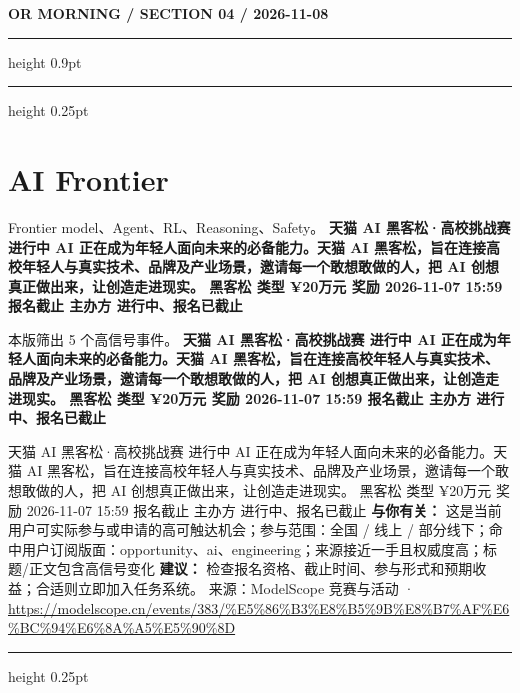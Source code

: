 \documentclass[10.5pt]{ctexart}
\begin{document}
\newpage
{\small\bfseries OR MORNING / SECTION 04 / 2026-11-08}
\vspace{2mm}
\hrule height 0.9pt
\vspace{1.5mm}
\hrule height 0.25pt
\vspace{4mm}
\section*{AI Frontier}
{\color{ormuted} Frontier model、Agent、RL、Reasoning、Safety。}
\vspace{2mm}
{\LARGE\bfseries 天猫 AI 黑客松·高校挑战赛 进行中 AI 正在成为年轻人面向未来的必备能力。天猫 AI 黑客松，旨在连接高校年轻人与真实技术、品牌及产业场景，邀请每一个敢想敢做的人，把 AI 创想真正做出来，让创造走进现实。 黑客松 类型 ¥20万元 奖励 2026-11-07 15:59 报名截止 主办方 进行中、报名已截止}\par
\vspace{1mm}
{\color{ormuted} 本版筛出 5 个高信号事件。}
\vspace{3mm}
{\Large\bfseries 天猫 AI 黑客松·高校挑战赛 进行中 AI 正在成为年轻人面向未来的必备能力。天猫 AI 黑客松，旨在连接高校年轻人与真实技术、品牌及产业场景，邀请每一个敢想敢做的人，把 AI 创想真正做出来，让创造走进现实。 黑客松 类型 ¥20万元 奖励 2026-11-07 15:59 报名截止 主办方 进行中、报名已截止}\par
天猫 AI 黑客松·高校挑战赛 进行中 AI 正在成为年轻人面向未来的必备能力。天猫 AI 黑客松，旨在连接高校年轻人与真实技术、品牌及产业场景，邀请每一个敢想敢做的人，把 AI 创想真正做出来，让创造走进现实。 黑客松 类型 ¥20万元 奖励 2026-11-07 15:59 报名截止 主办方 进行中、报名已截止
\textbf{与你有关：} 这是当前用户可实际参与或申请的高可触达机会；参与范围：全国 / 线上 / 部分线下；命中用户订阅版面：opportunity、ai、engineering；来源接近一手且权威度高；标题/正文包含高信号变化
\textbf{建议：} 检查报名资格、截止时间、参与形式和预期收益；合适则立即加入任务系统。
{\footnotesize\color{ormuted} 来源：ModelScope 竞赛与活动 · \url{https://modelscope.cn/events/383/%E5%86%B3%E8%B5%9B%E8%B7%AF%E6%BC%94%E6%8A%A5%E5%90%8D}}
\vspace{4mm}
\hrule height 0.25pt
\vspace{3mm}
\end{document}
